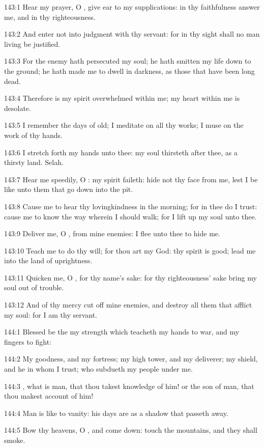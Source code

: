 143:1 Hear my prayer, O \LORD, give ear to my supplications: in thy faithfulness answer me, and in thy righteousness.

143:2 And enter not into judgment with thy servant: for in thy sight shall no man living be justified.

143:3 For the enemy hath persecuted my soul; he hath smitten my life down to the ground; he hath made me to dwell in darkness, as those that have been long dead.

143:4 Therefore is my spirit overwhelmed within me; my heart within me is desolate.

143:5 I remember the days of old; I meditate on all thy works; I muse on the work of thy hands.

143:6 I stretch forth my hands unto thee: my soul thirsteth after thee, as a thirsty land. Selah.

143:7 Hear me speedily, O \LORD: my spirit faileth: hide not thy face from me, lest I be like unto them that go down into the pit.

143:8 Cause me to hear thy lovingkindness in the morning; for in thee do I trust: cause me to know the way wherein I should walk; for I lift up my soul unto thee.

143:9 Deliver me, O \LORD, from mine enemies: I flee unto thee to hide me.

143:10 Teach me to do thy will; for thou art my God: thy spirit is good; lead me into the land of uprightness.

143:11 Quicken me, O \LORD, for thy name's sake: for thy righteousness' sake bring my soul out of trouble.

143:12 And of thy mercy cut off mine enemies, and destroy all them that afflict my soul: for I am thy servant.



144:1 Blessed be the \LORD my strength which teacheth my hands to war, and my fingers to fight:

144:2 My goodness, and my fortress; my high tower, and my deliverer; my shield, and he in whom I trust; who subdueth my people under me.

144:3 \LORD, what is man, that thou takest knowledge of him! or the son of man, that thou makest account of him!

144:4 Man is like to vanity: his days are as a shadow that passeth away.

144:5 Bow thy heavens, O \LORD, and come down: touch the mountains, and they shall smoke.

